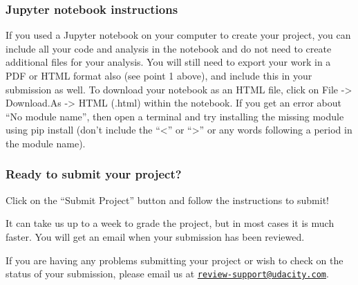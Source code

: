 \documentclass[]{book}
\begin{document}
\subsubsection{Jupyter notebook
instructions}\label{jupyter-notebook-instructions}

If you used a Jupyter notebook on your computer to create your project,
you can include all your code and analysis in the notebook and do not
need to create additional files for your analysis. You will still need
to export your work in a PDF or HTML format also (see point 1 above),
and include this in your submission as well. To download your notebook
as an HTML file, click on File -\textgreater{} Download.As
-\textgreater{} HTML (.html) within the notebook. If you get an error
about ``No module name'', then open a terminal and try installing the
missing module using pip install (don't include the ``\textless{}'' or
``\textgreater{}'' or any words following a period in the module name).

\subsubsection{Ready to submit your
project?}\label{ready-to-submit-your-project}

Click on the ``Submit Project'' button and follow the instructions to
submit!

It can take us up to a week to grade the project, but in most cases it
is much faster. You will get an email when your submission has been
reviewed.

If you are having any problems submitting your project or wish to check
on the status of your submission, please email us at
\href{mailto:review-support@udacity.com}{\nolinkurl{review-support@udacity.com}}.


\end{document}
